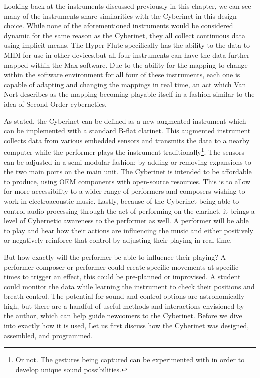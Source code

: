 Looking back at the instruments discussed previously in this chapter, we can see many of the instruments share similarities with the Cyberinet in this design choice. While none of the aforementioned instruments would be considered dynamic for the same reason as the Cyberinet, they all collect continuous data using implicit means. The Hyper-Flute specifically has the ability to the data to MIDI for use in other devices,but all four instruments can have the data further mapped within the Max software. Due to the ability for the mapping to change within the software environment for all four of these instruments, each one is capable of adapting and changing the mappings in real time, an act which Van Nort describes as the mapping becoming playable itself\cite{vanNortMapping2007} in a fashion similar to the idea of Second-Order cybernetics.


As stated, the Cyberinet can be defined as a new augmented instrument which can be implemented with a standard B-flat clarinet. This augmented instrument collects data from various embedded sensors and transmits the data to a nearby computer while the performer plays the instrument traditionally\footnote{Or not. The gestures being captured can be experimented with in order to develop unique sound possibilities.}. The sensors can be adjusted in a semi-modular fashion; by adding or removing expansions to the two main ports on the main unit. The Cyberinet is intended to be affordable to produce, using OEM components with open-source resources. This is to allow for more accessibility to a wider range of performers and composers wishing to work in electroacoustic music. Lastly, because of the Cyberinet being able to control audio processing through the act of performing on the clarinet, it brings a level of Cybernetic awareness to the performer as well. A performer will be able to play and hear how their actions are influencing the music and either positively or negatively reinforce that control by adjusting their playing in real time. 

But how exactly will the performer be able to influence their playing? A performer composer or performer could create specific movements at specific times to trigger an effect, this could be pre-planned or improvised. A student could monitor the data while learning the instrument to check their positions and breath control. The potential for sound and control options are astronomically high, but there are a handful of useful methods and interactions envisioned by the author, which can help guide newcomers to the Cyberinet. Before we dive into exactly how it is used, Let us first discuss how the Cyberinet was designed, assembled, and programmed.


